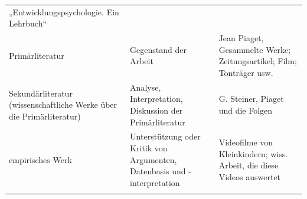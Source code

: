 \documentclass[]{book}
\theoremstyle{definition}
\theoremstyle{definition}
\theoremstyle{definition}
\theoremstyle{remark}
\begin{document}
\begin{longtable}[]{@{}lll@{}}
\begin{minipage}[t]{0.33\columnwidth}
„Entwicklungspsychologie. Ein Lehrbuch`` \vspace{5mm}\strut
\end{minipage}\tabularnewline
\begin{minipage}[t]{0.31\columnwidth}\raggedright\strut
Primärliteratur \vspace{5mm}\strut
\end{minipage} & \begin{minipage}[t]{0.27\columnwidth}\raggedright\strut
Gegenstand der Arbeit\vspace{5mm}\strut
\end{minipage} & \begin{minipage}[t]{0.33\columnwidth}\raggedright\strut
Jean Piaget, Gesammelte Werke; Zeitungsartikel; Film; Tonträger usw.
\vspace{5mm}\strut
\end{minipage}\tabularnewline
\begin{minipage}[t]{0.31\columnwidth}\raggedright\strut
Sekundärliteratur (wissenschaftliche Werke über die
Primärliteratur)\vspace{5mm}\strut
\end{minipage} & \begin{minipage}[t]{0.27\columnwidth}\raggedright\strut
Analyse, Interpretation, Diskussion der
Primärliteratur\vspace{5mm}\strut
\end{minipage} & \begin{minipage}[t]{0.33\columnwidth}\raggedright\strut
G. Steiner, Piaget und die Folgen \vspace{5mm}\strut
\end{minipage}\tabularnewline
\begin{minipage}[t]{0.31\columnwidth}\raggedright\strut
empirisches Werk\vspace{5mm}\strut
\end{minipage} & \begin{minipage}[t]{0.27\columnwidth}\raggedright\strut
Unterstützung oder Kritik von Argumenten, Datenbasis und
-interpretation\vspace{5mm}\strut
\end{minipage} & \begin{minipage}[t]{0.33\columnwidth}\raggedright\strut
Videofilme von Kleinkindern; wiss. Arbeit, die diese Videos auswertet
\vspace{5mm}\strut
\end{minipage}\tabularnewline
\begin{minipage}[t]{0.31\columnwidth}\raggedright\strut

\end{minipage}
\end{longtable}
\end{document}
